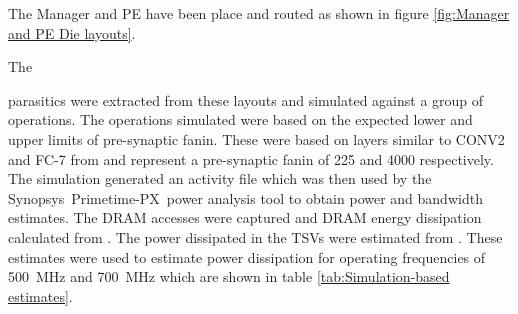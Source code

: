\documentclass[journal]{IEEEtran}
\begin{document}

The Manager and PE have been place and routed as shown in figure \ref{fig:Manager and PE Die layouts}. 
\iffalse
Although the design is yet to close timing, the 
\else
The
\fi
parasitics were extracted from these layouts and simulated against a group of operations. The operations simulated were based on the expected lower and upper limits of pre-synaptic fanin. These were based on layers similar to CONV2 and FC-7 from \cite{krizhevsky2012imagenet} and represent a pre-synaptic fanin of 225 and 4000 respectively.
The simulation generated an activity file which was then used by the Synopsys\textregistered ~Primetime-PX\texttrademark ~power analysis tool to obtain power and bandwidth estimates.
The DRAM accesses were captured and DRAM energy dissipation calculated from \cite{tezzaron:diram4}. The power dissipated in the TSVs were estimated from \cite{liu2012compact}.
These estimates were used to estimate power dissipation for operating frequencies of \SI{500}{\mega\hertz} and \SI{700}{\mega\hertz} which are shown in table \ref{tab:Simulation-based estimates}.
\end{document}
